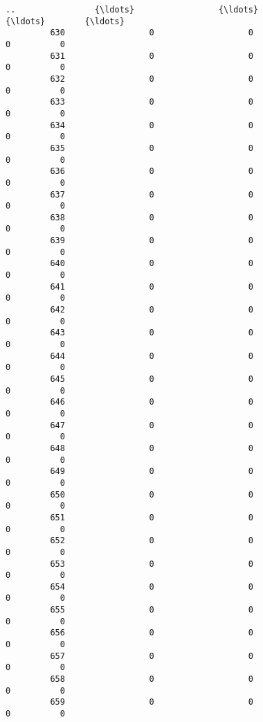 \documentclass[11pt]{article}
\begin{document}
\begin{Verbatim}[commandchars=\\\{\}]
         ..                {\ldots}                 {\ldots}                  {\ldots}        {\ldots}   
         630                 0                   0                    0          0   
         631                 0                   0                    0          0   
         632                 0                   0                    0          0   
         633                 0                   0                    0          0   
         634                 0                   0                    0          0   
         635                 0                   0                    0          0   
         636                 0                   0                    0          0   
         637                 0                   0                    0          0   
         638                 0                   0                    0          0   
         639                 0                   0                    0          0   
         640                 0                   0                    0          0   
         641                 0                   0                    0          0   
         642                 0                   0                    0          0   
         643                 0                   0                    0          0   
         644                 0                   0                    0          0   
         645                 0                   0                    0          0   
         646                 0                   0                    0          0   
         647                 0                   0                    0          0   
         648                 0                   0                    0          0   
         649                 0                   0                    0          0   
         650                 0                   0                    0          0   
         651                 0                   0                    0          0   
         652                 0                   0                    0          0   
         653                 0                   0                    0          0   
         654                 0                   0                    0          0   
         655                 0                   0                    0          0   
         656                 0                   0                    0          0   
         657                 0                   0                    0          0   
         658                 0                   0                    0          0   
         659                 0                   0                    0          0   
         

\end{Verbatim}
\end{document}
